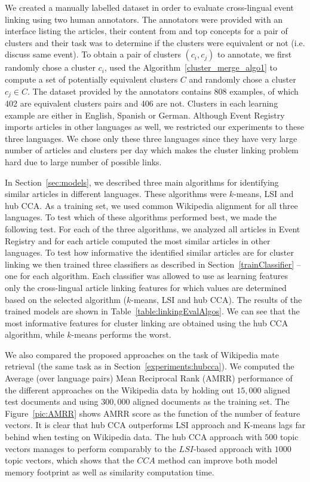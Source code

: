 \documentclass[twoside,11pt]{article}
\begin{document}
We created a manually labelled dataset in order to evaluate cross-lingual event linking using two human annotators. The annotators were provided with an interface listing the articles, their content from and top concepts for a pair of clusters and their task was to determine if the clusters were equivalent or not (i.e. discuss same event). To obtain a pair of clusters $(c_i, c_j)$ to annotate, we first randomly chose a cluster $c_i$, used the Algorithm~\ref{cluster_merge_algo1} to compute a set of potentially equivalent clusters $C$ and randomly chose a cluster $c_j \in C$. The dataset provided by the annotators contains 808 examples, of which 402 are equivalent clusters pairs and 406 are not. Clusters in each learning example are either in English, Spanish or German. Although Event Registry imports articles in other languages as well, we restricted our experiments to these three languages. We chose only these three languages since they have very large number of articles and clusters per day which makes the cluster linking problem hard due to large number of possible links.

In Section~\ref{sec:models}, we  described three main algorithms for identifying similar articles in different languages. These algorithms were $k$-means, LSI and hub CCA. As a training set, we used common Wikipedia alignment for all three languages. To test which of these algorithms performed best, we made the following test. For each of the three algorithms, we analyzed all articles in Event Registry and for each article computed the most similar articles in other languages. To test how informative the identified similar articles are for cluster linking we then trained three classifiers as described in Section~\ref{trainClassifier} -- one for each algorithm. Each classifier was allowed to use as learning features only the cross-lingual article linking features for which values are determined based on the selected algorithm ($k$-means, LSI and hub CCA). The results of the trained models are shown in Table~\ref{table:linkingEvalAlgos}.
We can see that the most informative features for cluster linking are obtained using the hub CCA algorithm, while $k$-means performs the worst.

We also compared the proposed approaches on the task of Wikipedia mate retrieval (the same task as in Section~\ref{experiments:hubcca}). We computed the Average (over language pairs) Mean Reciprocal Rank (AMRR)   performance of the different approaches on the  Wikipedia data by holding out $15,000$ aligned test documents and using $300,000$ aligned documents as the training set. The Figure~\ref{pic:AMRR} shows AMRR score as the function of the number of feature vectors. It is clear that hub CCA outperforms LSI approach and K-means lags far behind when testing on Wikipedia data. The hub CCA approach with $500$ topic vectors manages to perform comparably to the $LSI$-based approach with $1000$ topic vectors, which shows that the $CCA$ method can improve both model memory footprint as well as similarity computation time.
\end{document}
